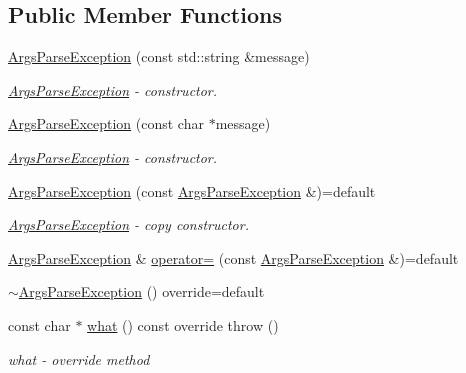 \subsection*{Public Member Functions}
\begin{DoxyCompactItemize}
\item 
\hyperlink{classtwo__gis__test_1_1argument__parser_1_1_args_parse_exception_a768f3334c218c1f23729253926566325}{Args\+Parse\+Exception} (const std\+::string \&message)
\begin{DoxyCompactList}\small\item\em \hyperlink{classtwo__gis__test_1_1argument__parser_1_1_args_parse_exception}{Args\+Parse\+Exception} -\/ constructor. \end{DoxyCompactList}\item 
\hyperlink{classtwo__gis__test_1_1argument__parser_1_1_args_parse_exception_a6111f03bd59e8afe83de05c42aafebb2}{Args\+Parse\+Exception} (const char $\ast$message)
\begin{DoxyCompactList}\small\item\em \hyperlink{classtwo__gis__test_1_1argument__parser_1_1_args_parse_exception}{Args\+Parse\+Exception} -\/ constructor. \end{DoxyCompactList}\item 
\hyperlink{classtwo__gis__test_1_1argument__parser_1_1_args_parse_exception_ae9f418bfb4bf5ff1c5a4d8a0fe9a7ae5}{Args\+Parse\+Exception} (const \hyperlink{classtwo__gis__test_1_1argument__parser_1_1_args_parse_exception}{Args\+Parse\+Exception} \&)=default
\begin{DoxyCompactList}\small\item\em \hyperlink{classtwo__gis__test_1_1argument__parser_1_1_args_parse_exception}{Args\+Parse\+Exception} -\/ copy constructor. \end{DoxyCompactList}\item 
\hyperlink{classtwo__gis__test_1_1argument__parser_1_1_args_parse_exception}{Args\+Parse\+Exception} \& \hyperlink{classtwo__gis__test_1_1argument__parser_1_1_args_parse_exception_a93abbb3ad22dc77bc20dc9e09e7f3827}{operator=} (const \hyperlink{classtwo__gis__test_1_1argument__parser_1_1_args_parse_exception}{Args\+Parse\+Exception} \&)=default
\item 
\hyperlink{classtwo__gis__test_1_1argument__parser_1_1_args_parse_exception_a952e63dbd0b42100e44fa7a8b0572abb}{$\sim$\+Args\+Parse\+Exception} () override=default
\item 
const char $\ast$ \hyperlink{classtwo__gis__test_1_1argument__parser_1_1_args_parse_exception_a46924e2f070476eaf5091c2d19bdc57c}{what} () const override  throw ()
\begin{DoxyCompactList}\small\item\em what -\/ override method \end{DoxyCompactList}\end{DoxyCompactItemize}


